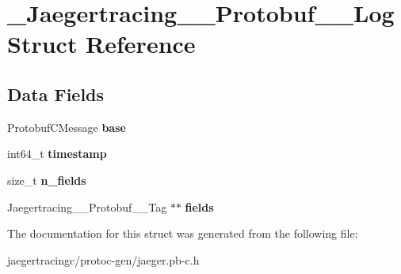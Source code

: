\hypertarget{struct__Jaegertracing____Protobuf____Log}{}\section{\+\_\+\+Jaegertracing\+\_\+\+\_\+\+Protobuf\+\_\+\+\_\+\+Log Struct Reference}
\label{struct__Jaegertracing____Protobuf____Log}
\subsection*{Data Fields}
\begin{DoxyCompactItemize}
\item 
\mbox{\label{struct__Jaegertracing____Protobuf____Log_a61d97614d14c7f7a6b770e2bacc3d7b4}} 
Protobuf\+C\+Message {\bfseries base}
\item 
\mbox{\label{struct__Jaegertracing____Protobuf____Log_a5c454c324e918baedc5c99d07aff66d1}} 
int64\+\_\+t {\bfseries timestamp}
\item 
\mbox{\label{struct__Jaegertracing____Protobuf____Log_ad9ba7daed1f1e1d273f22b4a03499aa4}} 
size\+\_\+t {\bfseries n\+\_\+fields}
\item 
\mbox{\label{struct__Jaegertracing____Protobuf____Log_af6a10f540b191616231931279af25add}} 
Jaegertracing\+\_\+\+\_\+\+Protobuf\+\_\+\+\_\+\+Tag $\ast$$\ast$ {\bfseries fields}
\end{DoxyCompactItemize}


The documentation for this struct was generated from the following file\+:\begin{DoxyCompactItemize}
\item 
jaegertracingc/protoc-\/gen/jaeger.\+pb-\/c.\+h\end{DoxyCompactItemize}
